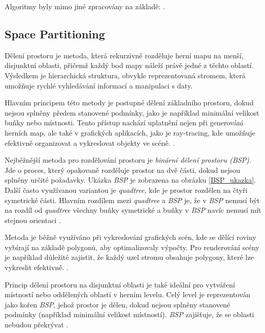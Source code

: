 Algoritmy byly mimo jiné zpracovány na základě: \cite{PCGinG}.

\subsection{Space Partitioning}


Dělení prostoru je metoda, která rekurzivně rozděluje herní mapu na menší, disjunktní oblasti, přičemž každý bod mapy náleží právě jedné z těchto oblastí. Výsledkem je hierarchická struktura, obvykle reprezentovaná stromem, která umožňuje rychlé vyhledávání informací a manipulaci s daty.

Hlavním principem této metody je postupné dělení základního prostoru, dokud nejsou splněny předem stanovené podmínky, jako je například minimální velikost buňky nebo místnosti. Tento přístup nachází uplatnění nejen při generování herních map, ale také v grafických aplikacích, jako je ray-tracing, kde umožňuje efektivně organizovat a vykreslovat objekty ve scéně. \cite{PCGclanek}.

Nejběžnější metoda pro rozdělování prostoru je \textit{binární dělení prostoru (BSP)}. Jde o proces, který opakovaně rozděluje prostor na dvě části, dokud nejsou splněny určité požadavky. Ukázka \textit{BSP} je zobrazena na obrázku \ref{BSP_ukazka}. Další často využívanou variantou je \textit{quadtree}, kde je prostor rozdělen na čtyři symetrické části. Hlavním rozdílem mezi \textit{quadtree} a \textit{BSP} je, že v \textit{BSP} nemusí být na rozdíl od \textit{quadtree} všechny buňky symetrické a buňky v \textit{BSP} navíc nemusí mít stejnou orientaci \cite{BSPclanek}.

Metoda je běžně využíváno při vykreslování grafických scén, kde se dělící roviny vybírají na základě polygonů, aby optimalizovaly výpočty. Pro renderování scény je například důležité zajistit, že každý uzel stromu obsahuje polygony, které lze vykreslit efektivně. \cite{BSPclanek}.

Princip dělení prostoru na disjunktní oblasti je také ideální pro vytváření místností nebo oddělených oblastí v herním levelu. Celý level je reprezentován jako kořen \textit{BSP}, jehož prostor je dělen, dokud nejsou splněny stanovené podmínky (například minimální velikost místností). \textit{BSP} zajišťuje, že se oblasti nebudou překrývat \cite{PCGclanek}.

